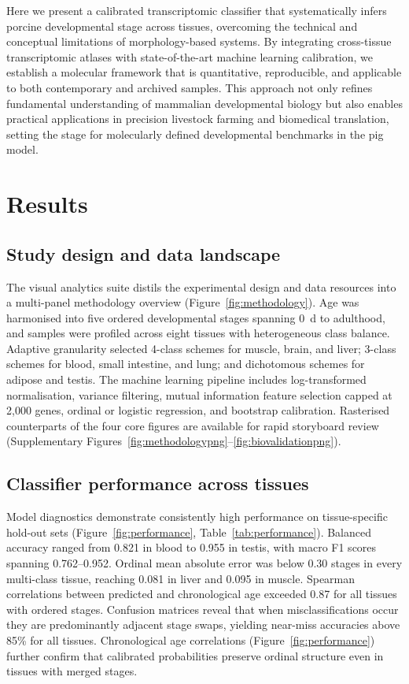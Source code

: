 \documentclass[11pt]{article}
\begin{document}
Here we present a calibrated transcriptomic classifier that systematically infers porcine developmental stage across tissues, overcoming the technical and conceptual limitations of morphology-based systems. By integrating cross-tissue transcriptomic atlases with state-of-the-art machine learning calibration, we establish a molecular framework that is quantitative, reproducible, and applicable to both contemporary and archived samples. This approach not only refines fundamental understanding of mammalian developmental biology but also enables practical applications in precision livestock farming and biomedical translation, setting the stage for molecularly defined developmental benchmarks in the pig model.

\section{Results}
\subsection{Study design and data landscape}
The visual analytics suite distils the experimental design and data resources into a multi-panel methodology overview (Figure~\ref{fig:methodology}). Age was harmonised into five ordered developmental stages spanning 0~d to adulthood, and samples were profiled across eight tissues with heterogeneous class balance. Adaptive granularity selected 4-class schemes for muscle, brain, and liver; 3-class schemes for blood, small intestine, and lung; and dichotomous schemes for adipose and testis. The machine learning pipeline includes log-transformed normalisation, variance filtering, mutual information feature selection capped at 2{,}000 genes, ordinal or logistic regression, and bootstrap calibration. Rasterised counterparts of the four core figures are available for rapid storyboard review (Supplementary Figures~\ref{fig:methodologypng}--\ref{fig:biovalidationpng}).

\subsection{Classifier performance across tissues}
Model diagnostics demonstrate consistently high performance on tissue-specific hold-out sets (Figure~\ref{fig:performance}, Table~\ref{tab:performance}). Balanced accuracy ranged from 0.821 in blood to 0.955 in testis, with macro F1 scores spanning 0.762--0.952. Ordinal mean absolute error was below 0.30 stages in every multi-class tissue, reaching 0.081 in liver and 0.095 in muscle. Spearman correlations between predicted and chronological age exceeded 0.87 for all tissues with ordered stages. Confusion matrices reveal that when misclassifications occur they are predominantly adjacent stage swaps, yielding near-miss accuracies above 85\% for all tissues. Chronological age correlations (Figure~\ref{fig:performance}) further confirm that calibrated probabilities preserve ordinal structure even in tissues with merged stages.
\end{document}
